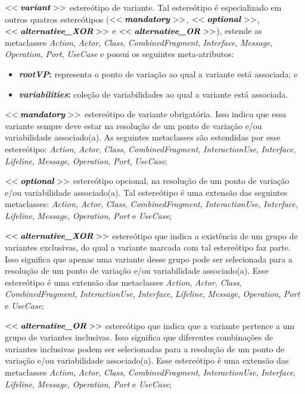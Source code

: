 $<<\textbf{\textit{variant}}>>$ estereótipo de variante. Tal estereótipo é especializado em outros quatros estereótipos ($<<\textbf{\textit{mandatory}}>>$, $<<\textbf{\textit{optional}}>>$, $<<\textbf{\textit{alternative\_XOR}}>>$ e $<<\textbf{\textit{alternative\_OR}}>>$), estende as metaclasses \textit{Action}, \textit{Actor}, \textit{Class}, \textit{CombinedFragment}, \textit{Interface}, \textit{Message}, \textit{Operation}, \textit{Port}, \textit{UseCase} e possui os seguintes meta-atributos:
\begin{itemize}
	\item \textbf{\textit{rootVP}:} representa o ponto de variação ao qual a variante está associada; e
	\item \textbf{\textit{variabilities}:} coleção de variabilidades ao qual a variante está associada.
\end{itemize}

$<<\textbf{\textit{mandatory}}>>$ estereótipo de variante obrigatória. Isso indica que essa variante sempre deve estar na resolução de um ponto de variação e/ou variabilidade associado(a). As seguintes metaclasses são estendidas por esse estereótipo: \textit{Action}, \textit{Actor}, \textit{Class}, \textit{CombinedFragment}, \textit{InteractionUse}, \textit{Interface}, \textit{Lifeline}, \textit{Message}, \textit{Operation}, \textit{Port}, \textit{UseCase};

$<<\textbf{\textit{optional}}>>$ estereótipo opcional, na resolução de um ponto de variação e/ou variabilidade associado(a). Tal estereótipo é uma extensão das seguintes metaclasses: \textit{Action}, \textit{Actor}, \textit{Class}, \textit{CombinedFragment}, \textit{InteractionUse}, \textit{Interface}, \textit{Lifeline}, \textit{Message}, \textit{Operation}, \textit{Port} e \textit{UseCase};

$<<\textbf{\textit{alternative\_XOR}}>>$ estereótipo que indica a existência de um grupo de variantes exclusivas, do qual a variante marcada com tal estereótipo faz parte. Isso significa que apenas uma variante desse grupo pode ser selecionada para a resolução de um ponto de variação e/ou variabilidade associado(a). Esse estereótipo é uma extensão das metaclasses \textit{Action}, \textit{Actor}, \textit{Class}, \textit{CombinedFragment}, \textit{InteractionUse}, \textit{Interface}, \textit{Lifeline}, \textit{Message}, \textit{Operation}, \textit{Port} e \textit{UseCase};

$<<\textbf{\textit{alternative\_OR}}>>$ estereótipo que indica que a variante pertence a um grupo de variantes inclusivas. Isso significa que diferentes combinações de variantes inclusivas podem ser selecionadas para a resolução de um ponto de variação e/ou variabilidade associado(a). Esse estereótipo é uma extensão das metaclasses \textit{Action}, \textit{Actor}, \textit{Class}, \textit{CombinedFragment}, \textit{InteractionUse}, \textit{Interface}, \textit{Lifeline}, \textit{Message}, \textit{Operation}, \textit{Port} e \textit{UseCase};

